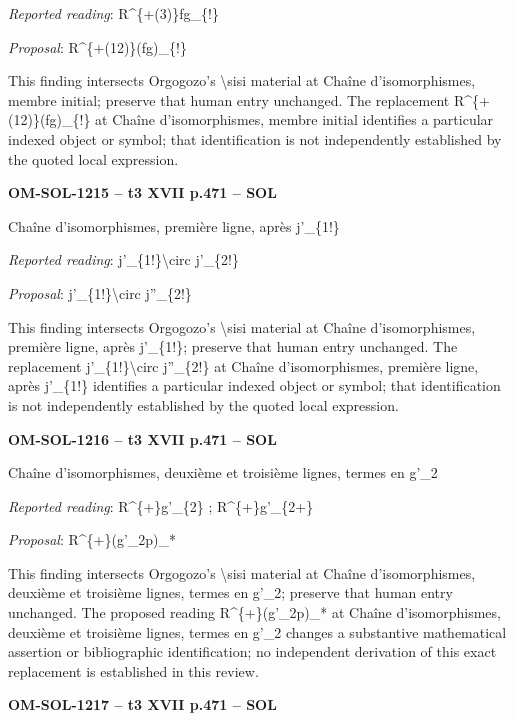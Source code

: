 \emph{Reported reading}: R\textasciicircum{}\{+(3)\}fg\_\{!\}\par
\emph{Proposal}: R\textasciicircum{}\{+(12)\}(fg)\_\{!\}\par
This finding intersects Orgogozo's \textbackslash{}sisi material at Chaîne d'isomorphismes, membre initial; preserve that human entry unchanged. The replacement R\textasciicircum{}\{+(12)\}(fg)\_\{!\} at Chaîne d'isomorphismes, membre initial identifies a particular indexed object or symbol; that identification is not independently established by the quoted local expression.\par
\par\noindent\textbf{OM-SOL-1215 -- t3 XVII p.471 -- SOL}\par
Chaîne d'isomorphismes, première ligne, après j'\_\{1!\}\par
\emph{Reported reading}: j'\_\{1!\}\textbackslash{}circ j'\_\{2!\}\par
\emph{Proposal}: j'\_\{1!\}\textbackslash{}circ j''\_\{2!\}\par
This finding intersects Orgogozo's \textbackslash{}sisi material at Chaîne d'isomorphismes, première ligne, après j'\_\{1!\}; preserve that human entry unchanged. The replacement j'\_\{1!\}\textbackslash{}circ j''\_\{2!\} at Chaîne d'isomorphismes, première ligne, après j'\_\{1!\} identifies a particular indexed object or symbol; that identification is not independently established by the quoted local expression.\par
\par\noindent\textbf{OM-SOL-1216 -- t3 XVII p.471 -- SOL}\par
Chaîne d'isomorphismes, deuxième et troisième lignes, termes en g'\_2\par
\emph{Reported reading}: R\textasciicircum{}\{+\}g'\_\{2\} ; R\textasciicircum{}\{+\}g'\_\{2+\}\par
\emph{Proposal}: R\textasciicircum{}\{+\}(g'\_2p)\_*\par
This finding intersects Orgogozo's \textbackslash{}sisi material at Chaîne d'isomorphismes, deuxième et troisième lignes, termes en g'\_2; preserve that human entry unchanged. The proposed reading R\textasciicircum{}\{+\}(g'\_2p)\_* at Chaîne d'isomorphismes, deuxième et troisième lignes, termes en g'\_2 changes a substantive mathematical assertion or bibliographic identification; no independent derivation of this exact replacement is established in this review.\par
\par\noindent\textbf{OM-SOL-1217 -- t3 XVII p.471 -- SOL}\par
